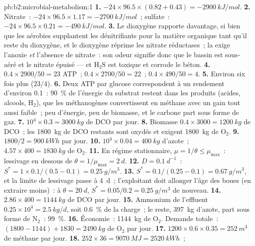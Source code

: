 \begin{solution}{pb:b2:microbial-metabolism:1}
\textbf{1.} $-24\times 96.5\times (0.82 + 0.43) = \qty{-2900}{kJ/mol}$.
\textbf{2.} Nitrate~: $-24\times 96.5\times 1.17 = \qty{-2700}{kJ/mol}$~;
sulfate~: $-24\times 96.5\times 0.21 = \qty{-490}{kJ/mol}$.
\textbf{3.} Le dioxygène rapporte davantage, si bien que les aérobies
supplantent les dénitrifiants pour la matière organique tant qu'il
reste du dioxygène, et le dioxygène réprime les nitrate réductases~; la
 exige l'anoxie \emph{et} l'absence de nitrate~: son
odeur signifie donc que le bassin est sous-aéré et le nitrate épuisé
--- et $\mathrm{H_2S}$ est toxique et corrode le béton.
\textbf{4.} $0.4\times 2900/50 = 23$ ATP~; $0.4\times 2700/50 = 22$~;
$0.4\times 490/50 = 4$.
\textbf{5.} Environ six fois plus ($23/4$).
\textbf{6.} Deux ATP par glucose correspondent à un rendement d'environ
\num{0.1}~: \qty{90}{\%} de l'énergie du substrat restent dans les
produits (acides, alcools, $\mathrm{H_2}$), que les méthanogènes
convertissent en méthane avec un gain tout aussi faible~; peu d'énergie,
peu de biomasse, et le carbone part sous forme de gaz.
\textbf{7.} $10^4\times 0.3 = \qty{3000}{kg}$ de DCO par jour.
\textbf{8.} Biomasse $0.4\times 3000 = \qty{1200}{kg}$ de DCO~; les
\qty{1800}{kg} de DCO restants sont oxydés et exigent \qty{1800}{kg}
de $\mathrm{O_2}$.
\textbf{9.} $1800/2 = \qty{900}{kWh}$ par jour.
\textbf{10.} $10^4\times 0.04 = \qty{400}{kg}$ d'azote~;
$4.57\times 400 = \qty{1830}{kg}$ de $\mathrm{O_2}$.
\textbf{11.} En régime stationnaire, $\mu = 1/\theta \le \mu_{\max}$~:
lessivage en dessous de $\theta = 1/\mu_{\max} = \qty{2}{d}$.
\textbf{12.} $D = \qty{0.1}{d^{-1}}$~: $S^* = 1\times 0.1/(0.5 - 0.1)
= \qty{0.25}{g/m^3}$.
\textbf{13.} $S^* = 0.1/(0.25 - 0.1) = \qty{0.67}{g/m^3}$, et la limite
de lessivage passe à \qty{4}{d}~; l'exploitant doit allonger l'âge des
boues (en extraire moins)~: à $\theta = \qty{20}{d}$, $S^* =
0.05/0.2 = \qty{0.25}{g/m^3}$ de nouveau.
\textbf{14.} $2.86\times 400 = \qty{1144}{kg}$ de DCO par jour.
\textbf{15.} Ammonium de l'effluent $0.25\times 10^4 = \qty{2.5}{kg/d}$,
soit \qty{0.6}{\%} de la charge~; le reste, \qty{397}{kg} d'azote, part
sous forme de $\mathrm{N_2}$~: \qty{99}{\%}.
\textbf{16.} Économie~: \qty{1144}{kg} de $\mathrm{O_2}$. Demande
totale~: $(1800 - 1144) + 1830 = \qty{2490}{kg}$ de $\mathrm{O_2}$ par
jour.
\textbf{17.} $1200\times 0.6\times 0.35 = \qty{252}{m^3}$ de méthane
par jour.
\textbf{18.} $252\times 36 = \qty{9070}{MJ} = \qty{2520}{kWh}$~;

\end{solution}
